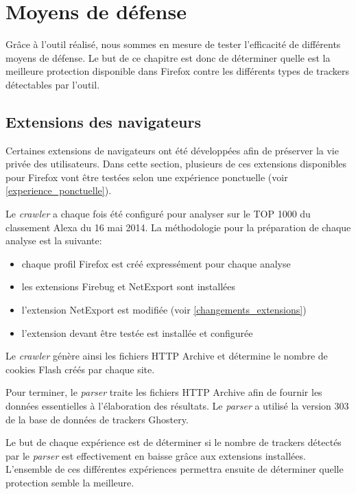 \chapter{Moyens de défense}
Grâce à l'outil réalisé, nous sommes en mesure de tester l'efficacité de différents moyens de défense.
Le but de ce chapitre est donc de déterminer quelle est la meilleure protection disponible dans Firefox contre les différents types de trackers détectables par l'outil.

\section{Extensions des navigateurs}
\label{extensions_navigateurs}
Certaines extensions de navigateurs ont été développées afin de préserver la vie privée des utilisateurs.
Dans cette section, plusieurs de ces extensions disponibles pour Firefox vont être testées selon une expérience ponctuelle (voir \autoref{experience_ponctuelle}).
\newline

Le \textit{crawler} a chaque fois été configuré pour analyser sur le TOP 1000 du classement Alexa \cite{AlexaTop} du 16 mai 2014. La méthodologie pour la préparation de chaque analyse est la suivante:
\begin{itemize}
  \item chaque profil Firefox est créé expressément pour chaque analyse
  \item les extensions Firebug et NetExport sont installées
  \item l'extension NetExport est modifiée (voir \autoref{changements_extensions})
  \item l'extension devant être testée est installée et configurée
  \newline
\end{itemize}

Le \textit{crawler} génère ainsi les fichiers HTTP Archive et détermine le nombre de cookies Flash créés par chaque site.
\newline

Pour terminer, le \textit{parser} traite les fichiers HTTP Archive afin de fournir les données essentielles à l'élaboration des résultats. Le \textit{parser} a utilisé la version 303 de la base de données de trackers Ghostery.
\newline

Le but de chaque expérience est de déterminer si le nombre de trackers détectés par le \textit{parser} est effectivement en baisse grâce aux extensions installées. L'ensemble de ces différentes expériences permettra ensuite de déterminer quelle protection semble la meilleure.
\newline

